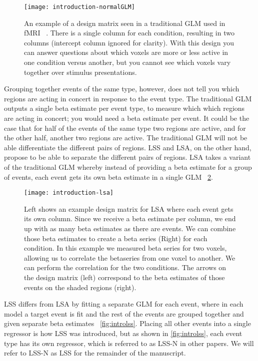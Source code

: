 \documentclass[10pt,letterpaper]{article}
\begin{document}
\begin{figure}[H]
  \centering
  \texttt{[image: introduction-normalGLM]}
  \caption{
    An example of a design matrix seen in a traditional GLM used in fMRI ~\cite{Friston1995}.
    There is a single column for each condition, resulting in two columns (intercept column ignored for clarity).
    With this design you can answer questions about which voxels are more or less active in one condition
    versus another, but you cannot see which voxels vary together over stimulus presentations.
  }
  \label{fig:introGLM}
\end{figure}

Grouping together events of the same type, however, does not tell you which regions are acting in concert
in response to the event type.
The traditional GLM outputs a single beta estimate per event type, to measure which which regions
are acting in concert; you would need a beta estimate per event.
It could be the case that for half of the events of the same type two regions are active,
and for the other half, another two regions are active.
The traditional GLM will not be able differentiate the different pairs of regions.
LSS and LSA, on the other hand, propose to be able to separate the different pairs of regions.
LSA takes a variant of the traditional GLM whereby instead of providing a beta
estimate for a group of events, each event gets its own beta estimate in a single GLM ~\ref{fig:introlsa}.

\begin{figure}[H]
  \centering
  \texttt{[image: introduction-lsa]}
  \caption{
    Left shows an example design matrix for LSA where each event gets its own column.
    Since we receive a beta estimate per column, we end up with as many beta estimates as there
    are events.
    We can combine those beta estimates to create a beta series (Right) for each condition.
    In this example we measured beta series for two voxels, allowing us to
    correlate the betaseries from one voxel to another.
    We can perform the correlation for the two conditions.
    The arrows on the design matrix (left) correspond to the beta estimates of those events
    on the shaded regions (right).
  }
  \label{fig:introlsa}
\end{figure}

LSS differs from LSA by fitting a separate GLM for each event, where in each model a target
event is fit and the rest of the events are grouped together and given separate beta estimates ~\ref{fig:introlss}.
Placing all other events into a single regressor is how LSS was introduced, but as shown in \ref{fig:introlss},
each event type has its own regressor, which is referred to as LSS-N in other papers.
We will refer to LSS-N as LSS for the remainder of the manuscript.
\end{document}
